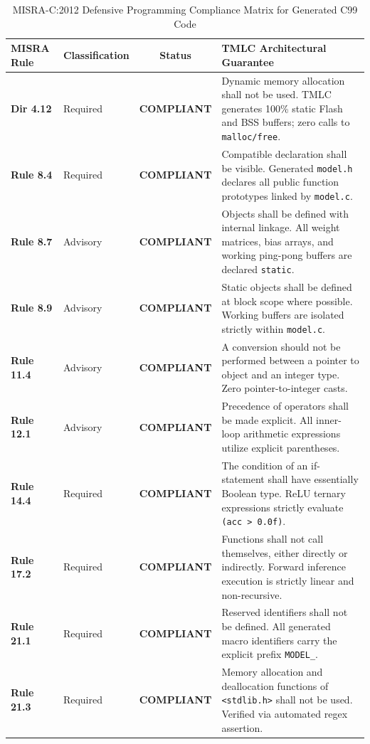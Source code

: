 \documentclass[11pt,a4paper]{article}
\begin{document}
\begin{table}[htbp]
\centering
\small
\caption{MISRA-C:2012 Defensive Programming Compliance Matrix for Generated C99 Code}
\label{tab:misra_compliance}
\begin{tabular}{llcp{6.5cm}}
\toprule
\textbf{MISRA Rule} & \textbf{Classification} & \textbf{Status} & \textbf{TMLC Architectural Guarantee} \\
\midrule
\textbf{Dir 4.12}   & Required & \textbf{COMPLIANT} & Dynamic memory allocation shall not be used. TMLC generates 100\% static Flash and BSS buffers; zero calls to \texttt{malloc/free}. \\
\textbf{Rule 8.4}   & Required & \textbf{COMPLIANT} & Compatible declaration shall be visible. Generated \texttt{model.h} declares all public function prototypes linked by \texttt{model.c}. \\
\textbf{Rule 8.7}   & Advisory & \textbf{COMPLIANT} & Objects shall be defined with internal linkage. All weight matrices, bias arrays, and working ping-pong buffers are declared \texttt{static}. \\
\textbf{Rule 8.9}   & Advisory & \textbf{COMPLIANT} & Static objects shall be defined at block scope where possible. Working buffers are isolated strictly within \texttt{model.c}. \\
\textbf{Rule 11.4}  & Advisory & \textbf{COMPLIANT} & A conversion should not be performed between a pointer to object and an integer type. Zero pointer-to-integer casts. \\
\textbf{Rule 12.1}  & Advisory & \textbf{COMPLIANT} & Precedence of operators shall be made explicit. All inner-loop arithmetic expressions utilize explicit parentheses. \\
\textbf{Rule 14.4}  & Required & \textbf{COMPLIANT} & The condition of an if-statement shall have essentially Boolean type. ReLU ternary expressions strictly evaluate \texttt{(acc > 0.0f)}. \\
\textbf{Rule 17.2}  & Required & \textbf{COMPLIANT} & Functions shall not call themselves, either directly or indirectly. Forward inference execution is strictly linear and non-recursive. \\
\textbf{Rule 21.1}  & Required & \textbf{COMPLIANT} & Reserved identifiers shall not be defined. All generated macro identifiers carry the explicit prefix \texttt{MODEL\_}. \\
\textbf{Rule 21.3}  & Required & \textbf{COMPLIANT} & Memory allocation and deallocation functions of \texttt{<stdlib.h>} shall not be used. Verified via automated regex assertion. \\
\bottomrule
\end{tabular}
\end{table}
\end{document}
